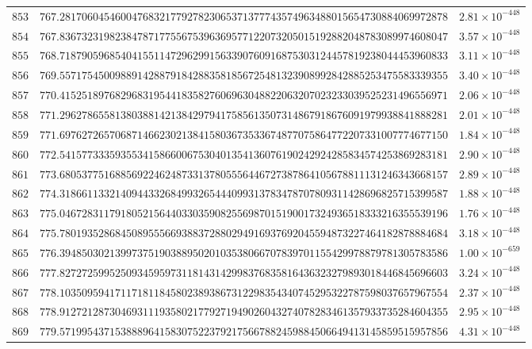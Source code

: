 \documentclass[12pt,reqno]{amsart}
\theoremstyle{remark}
\begin{document}
\begin{longtable}{clc}
$853$ & $767.2817060454600476832177927823065371377743574963488015654730884069972878$ & $2.81\times 10^{-448}$ \\
$854$ & $767.8367323198238478717755675396369577122073205015192882048783089974608047$ & $3.57\times 10^{-448}$ \\
$855$ & $768.7187905968540415511472962991563390760916875303124457819238044453960833$ & $3.11\times 10^{-448}$ \\
$856$ & $769.5571754500988914288791842883581856725481323908992842885253475583339355$ & $3.40\times 10^{-448}$ \\
$857$ & $770.4152518976829683195441835827606963048822063207023233039525231496556971$ & $2.06\times 10^{-448}$ \\
$858$ & $771.2962786558138038814213842979417585613507314867918676091979938841888281$ & $2.01\times 10^{-448}$ \\
$859$ & $771.6976272657068714662302138415803673533674877075864772207331007774677150$ & $1.84\times 10^{-448}$ \\
$860$ & $772.5415773335935534158660067530401354136076190242924285834574253869283181$ & $2.90\times 10^{-448}$ \\
$861$ & $773.6805377516885692246248733137805556446727387864105678811131246343668157$ & $2.89\times 10^{-448}$ \\
$862$ & $774.3186611332140944332684993265444099313783478707809311428696825715399587$ & $1.88\times 10^{-448}$ \\
$863$ & $775.0467283117918052156440330359082556987015190017324936518333216355539196$ & $1.76\times 10^{-448}$ \\
$864$ & $775.7801935286845089555669388372880294916937692045594873227464182878884684$ & $3.18\times 10^{-448}$ \\
$865$ & $776.3948503021399737519038895020103538066707839701155429978879781305783586$ & $1.00\times 10^{-659}$ \\
$866$ & $777.8272725995250934595973118143142998376835816436323279893018446845696603$ & $3.24\times 10^{-448}$ \\
$867$ & $778.1035095941711718118458023893867312298354340745295322787598037657967554$ & $2.37\times 10^{-448}$ \\
$868$ & $778.9127212873046931119358021779271949026043274078283461357933735284604355$ & $2.95\times 10^{-448}$ \\
$869$ & $779.5719954371538889641583075223792175667882459884506649413145859515957856$ & $4.31\times 10^{-448}$ \\

\end{longtable}
\end{document}
